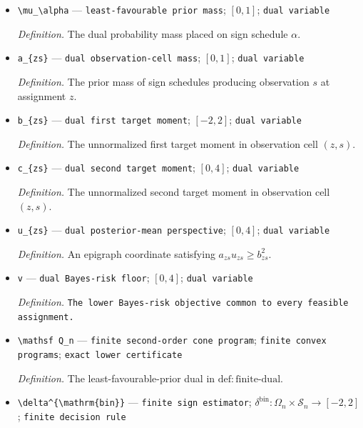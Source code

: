 \documentclass{article}
\begin{document}
\begin{itemize}
  \item \texttt{\textbackslash{}\allowbreak{}mu\_\allowbreak{}\textbackslash{}\allowbreak{}alpha} --- \texttt{least-\allowbreak{}favourable prior mass}; \([0,1]\); \texttt{dual variable}
  \par\smallskip\noindent\emph{Definition.} The dual probability mass placed on sign schedule \(\alpha\).
  \item \texttt{a\_\allowbreak{}\{zs\}\allowbreak{}} --- \texttt{dual observation-\allowbreak{}cell mass}; \([0,1]\); \texttt{dual variable}
  \par\smallskip\noindent\emph{Definition.} The prior mass of sign schedules producing observation \(s\) at assignment \(z\).
  \item \texttt{b\_\allowbreak{}\{zs\}\allowbreak{}} --- \texttt{dual first target moment}; \([-2,2]\); \texttt{dual variable}
  \par\smallskip\noindent\emph{Definition.} The unnormalized first target moment in observation cell \((z,s)\).
  \item \texttt{c\_\allowbreak{}\{zs\}\allowbreak{}} --- \texttt{dual second target moment}; \([0,4]\); \texttt{dual variable}
  \par\smallskip\noindent\emph{Definition.} The unnormalized second target moment in observation cell \((z,s)\).
  \item \texttt{u\_\allowbreak{}\{zs\}\allowbreak{}} --- \texttt{dual posterior-\allowbreak{}mean perspective}; \([0,4]\); \texttt{dual variable}
  \par\smallskip\noindent\emph{Definition.} An epigraph coordinate satisfying \(a_{zs}u_{zs}\ge b_{zs}^2\).
  \item \texttt{v} --- \texttt{dual Bayes-\allowbreak{}risk floor}; \([0,4]\); \texttt{dual variable}
  \par\smallskip\noindent\emph{Definition.} \texttt{The lower Bayes-\allowbreak{}risk objective common to every feasible assignment.}
  \item \texttt{\textbackslash{}\allowbreak{}mathsf Q\_\allowbreak{}n} --- \texttt{finite second-\allowbreak{}order cone program}; \texttt{finite convex programs}; \texttt{exact lower certificate}
  \par\smallskip\noindent\emph{Definition.} The least-favourable-prior dual in \(\mathrm{def{:}finite\text{-}dual}\).
  \item \texttt{\textbackslash{}\allowbreak{}delta\textasciicircum{}\{\textbackslash{}\allowbreak{}mathrm\{bin\}\allowbreak{}\}\allowbreak{}} --- \texttt{finite sign estimator}; \(\delta^{\mathrm{bin}}:\Omega_n\times\mathcal S_n\to[-2,2]\); \texttt{finite decision rule}

\end{itemize}
\end{document}
